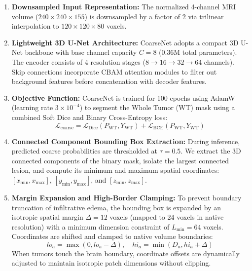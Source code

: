 \documentclass[12pt, a4paper]{article}
\begin{document}
\begin{enumerate}[leftmargin=*, itemsep=4pt]
    \item \textbf{Downsampled Input Representation:} The normalized 4-channel MRI volume ($240 \times 240 \times 155$) is downsampled by a factor of 2 via trilinear interpolation to $120 \times 120 \times 80$ voxels.
    \item \textbf{Lightweight 3D U-Net Architecture:} CoarseNet adopts a compact 3D U-Net backbone with base channel capacity $C=8$ (0.36M total parameters). The encoder consists of 4 resolution stages ($8 \to 16 \to 32 \to 64$ channels). Skip connections incorporate CBAM attention modules to filter out background features before concatenation with decoder features.
    \item \textbf{Objective Function:} CoarseNet is trained for 100 epochs using AdamW (learning rate $3 \times 10^{-4}$) to segment the Whole Tumor (WT) mask using a combined Soft Dice and Binary Cross-Entropy loss:
    \begin{equation}
        \mathcal{L}_{\text{coarse}} = \mathcal{L}_{\text{Dice}}(P_{\text{WT}}, Y_{\text{WT}}) + \mathcal{L}_{\text{BCE}}(P_{\text{WT}}, Y_{\text{WT}})
    \end{equation}
    \item \textbf{Connected Component Bounding Box Extraction:} During inference, predicted coarse probabilities are thresholded at $\tau = 0.5$. We extract the 3D connected components of the binary mask, isolate the largest connected lesion, and compute its minimum and maximum spatial coordinates: $[x_{\min}, x_{\max}]$, $[y_{\min}, y_{\max}]$, and $[z_{\min}, z_{\max}]$.
    \item \textbf{Margin Expansion and High-Border Clamping:} To prevent boundary truncation of infiltrative edema, the bounding box is expanded by an isotropic spatial margin $\Delta = 12$ voxels (mapped to 24 voxels in native resolution) with a minimum dimension constraint of $L_{\min} = 64$ voxels. Coordinates are shifted and clamped to native volume boundaries:
    \begin{equation}
        lo_a = \max(0, lo_a - \Delta), \quad hi_a = \min(D_a, hi_a + \Delta)
    \end{equation}
    When tumors touch the brain boundary, coordinate offsets are dynamically adjusted to maintain isotropic patch dimensions without clipping.
\end{enumerate}
\end{document}
